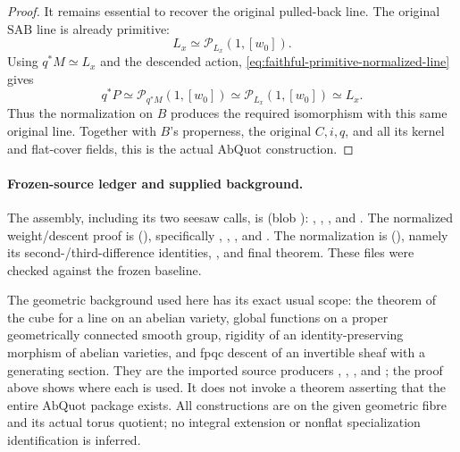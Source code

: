 \begin{proof}
It remains essential to recover the original pulled-back line.
The original \(\mathrm{SAB}\) line is already primitive:
\[
                         L_x\simeq\mathcal P_{L_x}(1,[w_0]).
\]
Using \(q^*M\simeq L_x\) and the descended action,
\eqref{eq:faithful-primitive-normalized-line} gives
\[
              q^*P\simeq\mathcal P_{q^*M}(1,[w_0])
                       \simeq\mathcal P_{L_x}(1,[w_0])
                       \simeq L_x .
\]
Thus the normalization on \(B\) produces the required
isomorphism with this same original line.
Together with \(B\)'s properness, the original \(C,i,q\),
and all its kernel and flat-cover fields, this is the
actual \(\mathrm{AbQuot}\) construction.
\end{proof}

\paragraph{Frozen-source ledger and supplied background.}
The assembly, including its two seesaw calls, is
\href{https://github.com/ChristianKudeba/alpoge-rh-verification/blob/alpoge-source-7cbf7a0c/src/Development/AutomorphicSpectrum/Proofs/GeometryProofs/AbelianQuotientOfPowerFns.lean}
{}
(blob ):
, ,
, and .
The normalized weight/descent proof is
\href{https://github.com/ChristianKudeba/alpoge-rh-verification/blob/alpoge-source-7cbf7a0c/src/Development/AutomorphicSpectrum/Proofs/GeometryProofs/PicardClassTrivialBySeesaw.lean}
{}
(),
specifically ,
, ,
and .
The normalization is
\href{https://github.com/ChristianKudeba/alpoge-rh-verification/blob/alpoge-source-7cbf7a0c/src/Development/AbelianVarietyTheory/Proofs/ModuliProofs/ExistsPrimitiveNormalisation.lean}
{}
(),
namely its second-/third-difference identities,
, and final theorem.
These files were checked against the frozen baseline.

The geometric background used here has its exact usual scope:
the theorem of the cube for a line on an abelian variety,
global functions on a proper geometrically connected smooth
group, rigidity of an identity-preserving morphism of abelian
varieties, and fpqc descent of an invertible sheaf with a
generating section.  They are the imported source producers
,
, ,
and ; the proof above shows where
each is used.  It does not invoke a theorem asserting that the
entire \(\mathrm{AbQuot}\) package exists.
All constructions are on the given geometric fibre and its
actual torus quotient; no integral extension or nonflat
specialization identification is inferred.
